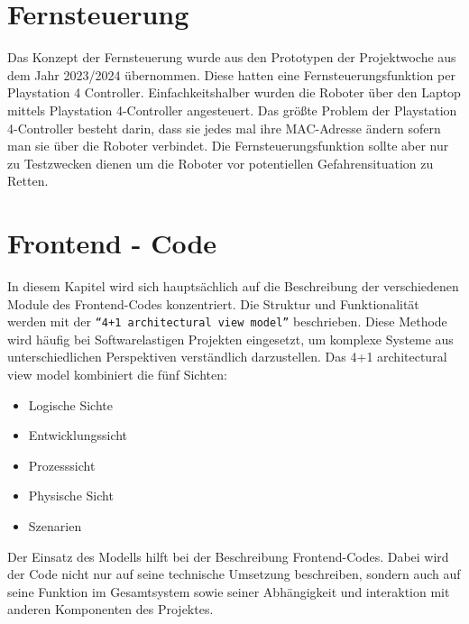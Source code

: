 \section{Fernsteuerung}
\label{subsec:frontend_control}
Das Konzept der Fernsteuerung wurde aus den Prototypen der Projektwoche aus dem Jahr 2023/2024 übernommen.
%
Diese hatten eine Fernsteuerungsfunktion per Playstation 4 Controller. Einfachkeitshalber wurden die Roboter über 
den Laptop mittels Playstation 4-Controller angesteuert. 
%
Das größte Problem der Playstation 4-Controller besteht darin, dass sie jedes mal ihre MAC-Adresse ändern sofern
man sie über die Roboter verbindet.  
%
Die Fernsteuerungsfunktion sollte aber nur zu Testzwecken dienen um die Roboter 
vor potentiellen Gefahrensituation zu Retten. 

\section{Frontend - Code}
\label{subsec:frontend_Code}
In diesem Kapitel wird sich hauptsächlich auf die Beschreibung der verschiedenen Module des
Frontend-Codes konzentriert. Die Struktur und Funktionalität werden mit der \texttt{``4+1 architectural view model''} beschrieben.
%
Diese Methode wird häufig bei Softwarelastigen Projekten eingesetzt, um komplexe Systeme aus unterschiedlichen
Perspektiven verständlich darzustellen.
Das 4+1 architectural view model kombiniert die fünf Sichten:
\begin{itemize}
  \item Logische Sichte
  \item Entwicklungssicht
  \item Prozesssicht
  \item Physische Sicht
  \item Szenarien
\end{itemize} 
Der Einsatz des Modells hilft bei der Beschreibung Frontend-Codes. 
Dabei wird der Code nicht nur auf seine technische Umsetzung beschreiben,
sondern auch auf seine Funktion im Gesamtsystem 
sowie seiner Abhängigkeit und interaktion mit anderen Komponenten des Projektes.

